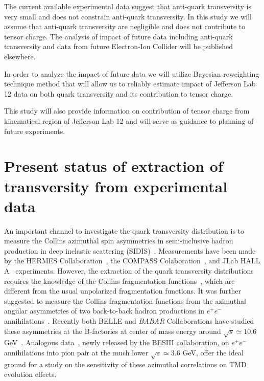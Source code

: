 \documentclass[twocolumn,showpacs,preprintnumbers,amsmath,amssymb,floatfix,prd]{revtex4}
\begin{document}
The current available experimental data suggest that anti-quark transversity is very small and does not constrain anti-quark transversity. In this study we will assume that anti-quark transversity are negligible and does not contribute to tensor charge. The analysis of impact of future data including anti-quark transversity and data from future Electron-Ion Collider will be published elsewhere.

In order to analyze the impact of future data we will utilize Bayesian reweighting technique method that will allow us to reliably estimate impact of Jefferson Lab 12 data on both quark transversity and its contribution to tensor charge.

This study will also provide information on contribution of tensor charge from kinematical region of Jefferson Lab 12 and will serve as   guidance to planning of future experiments.

\section{Present status of extraction of transversity from experimental data }
An important channel to investigate the quark transversity distribution is to measure the
Collins azimuthal spin asymmetries in semi-inclusive hadron
production in deep inelastic scattering (SIDIS)~\cite{Collins:1992kk}. 
Measurements have been made by the HERMES Collaboration~\cite{Airapetian:2004tw,Airapetian:2010ds}, the COMPASS Colaboration~\cite{Adolph:2012sn}, 
and JLab HALL A~\cite{Qian:2011py} experiments.
However, the extraction of the quark transversity distributions requires
the knowledge of the Collins fragmentation functions~\cite{Collins:1992kk}, which
are different from the usual unpolarized fragmentation functions. It was further
suggested to measure the Collins fragmentation functions from the 
azimuthal angular asymmetries of two back-to-back hadron productions in $e^+e^-$ annihilations~\cite{Boer:1997mf}. 
Recently both BELLE and {\em BABAR} Collaborations have studied these
asymmetries at the B-factories at center of mass energy around
$\sqrt{s}\simeq 10.6$ GeV~\cite{Abe:2005zx,Seidl:2008xc,Garzia:2012za}.
Analogous data~\cite{Ablikim:2015sma}, newly released by the BESIII collaboration, on $e^+e^-$ annihilations into pion pair at the much lower $\sqrt{s}\simeq 3.6$ GeV, offer the ideal ground for a study on the sensitivity of these azimuthal correlations on TMD evolution effects.
\end{document}
